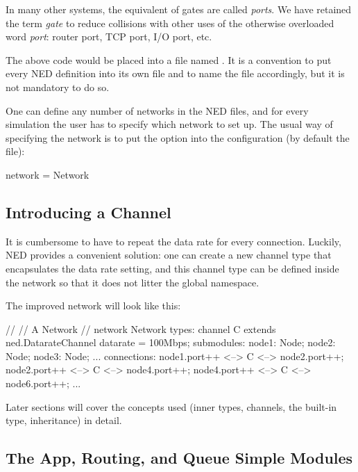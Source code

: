 \begin{note}
    In many other systems, the equivalent of {\opp} gates are called
    \textit{ports}. We have retained the term \textit{gate} to reduce
    collisions with other uses of the otherwise overloaded word
    \textit{port}: router port, TCP port, I/O port, etc.
\end{note}

The above code would be placed into a file named . It is
a convention to put every NED definition into its own file and to name the
file accordingly, but it is not mandatory to do so.

One can define any number of networks in the NED files, and for every
simulation the user has to specify which network to set up.
The usual way of specifying the network is to put the 
option into the configuration (by default the  file):

\begin{inifile}
[General]
network = Network
\end{inifile}


\subsection{Introducing a Channel}
\label{sec:ned-lang:warmup:introducing-a-channel}

It is cumbersome to have to repeat the data rate for every connection.
Luckily, NED provides a convenient solution: one can create a new channel
type that encapsulates the data rate setting, and this channel type can
be defined inside the network so that it does not litter the global
namespace.

The improved network will look like this:

\begin{ned}
//
// A Network
//
network Network
{
    types:
        channel C extends ned.DatarateChannel {
            datarate = 100Mbps;
        }
    submodules:
        node1: Node;
        node2: Node;
        node3: Node;
        ...
    connections:
        node1.port++ <--> C <--> node2.port++;
        node2.port++ <--> C <--> node4.port++;
        node4.port++ <--> C <--> node6.port++;
        ...
}
\end{ned}

Later sections will cover the concepts used (inner types, channels, the
 built-in type, inheritance) in detail.


\subsection{The App, Routing, and Queue Simple Modules}
\label{sec:ned-lang:warmup:the-simple-modules}

